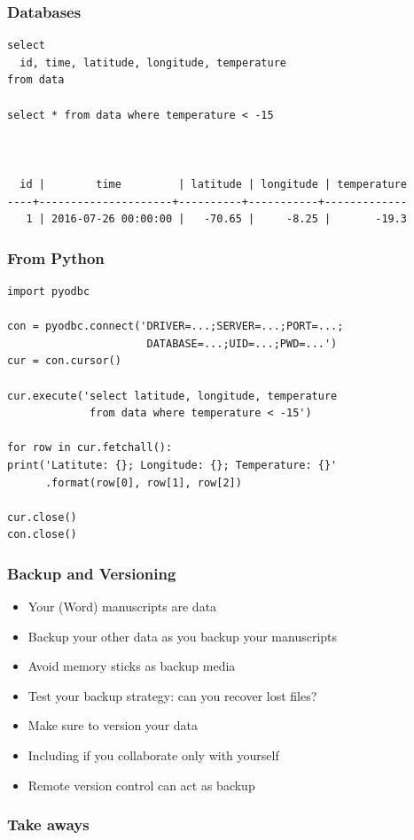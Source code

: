 \documentclass{beamer}
\begin{document}
\begin{frame}[fragile]
  \frametitle{Databases}
  
  \small
  \begin{verbatim}
select 
  id, time, latitude, longitude, temperature
from data
  
select * from data where temperature < -15
  
  
  
  id |        time         | latitude | longitude | temperature 
----+---------------------+----------+-----------+-------------
   1 | 2016-07-26 00:00:00 |   -70.65 |     -8.25 |       -19.3 
  \end{verbatim}
\end{frame}

\begin{frame}[fragile]
  \frametitle{From Python}
  
  \small
  \begin{verbatim}
import pyodbc

con = pyodbc.connect('DRIVER=...;SERVER=...;PORT=...;
                      DATABASE=...;UID=...;PWD=...')
cur = con.cursor()

cur.execute('select latitude, longitude, temperature 
             from data where temperature < -15')

for row in cur.fetchall():
print('Latitute: {}; Longitude: {}; Temperature: {}'
      .format(row[0], row[1], row[2])

cur.close()
con.close()
  \end{verbatim}
\end{frame}

\begin{frame}
  \frametitle{Backup and Versioning}
  
  \begin{itemize}
  \item Your (Word) manuscripts are data
  \item Backup your other data as you backup your manuscripts
  \item Avoid memory sticks as backup media
  \item Test your backup strategy: can you recover lost files?
  \item Make sure to version your data
  \item Including if you collaborate only with yourself
  \item Remote version control can act as backup
  \end{itemize}
\end{frame}

\begin{frame}
  \frametitle{Take aways}
  
\end{frame}
\end{document}
